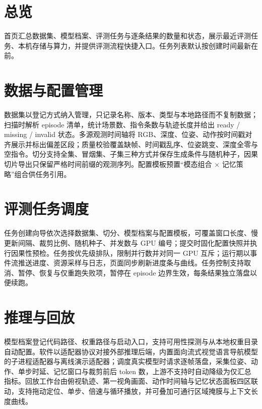 \section{总览}

首页汇总数据集、模型档案、评测任务与逐条结果的数量和状态，展示最近评测任务、本机存储与算力，并提供评测流程快捷入口。任务列表默认按创建时间最新在前。


\section{数据与配置管理}

数据集以登记方式纳入管理，只记录名称、版本、类型与本地路径而不复制数据；扫描时解析 episode 清单，统计场景数、指令条数与轨迹长度并给出 ready / missing / invalid 状态。多源观测时间轴将 RGB、深度、位姿、动作按时间戳对齐展示并标出偏差区段；质量校验覆盖缺帧、时间戳乱序、位姿跳变、深度全零与空指令。切分支持全集、冒烟集、子集三种方式并保存生成条件与随机种子，因果切片导出只保留严格时间前缀的观测序列。配置模板预置“模态组合 × 记忆策略”组合供任务引用。


\section{评测任务调度}

任务创建向导依次选择数据集、切分、模型档案与配置模板，可覆盖窗口长度、慢更新间隔、裁剪比例、随机种子、并发数与 GPU 编号；提交时固化配置快照并执行因果性预检。任务按优先级排队，限制并行数并对同一 GPU 互斥；运行期以事件流推送进度、资源采样与日志，页面同步刷新进度条与曲线。任务控制支持取消、暂停、恢复与仅重跑失败项，暂停在 episode 边界生效，每条结果独立落盘以便续跑。


\section{推理与回放}

模型档案登记代码路径、权重路径与启动入口，支持可用性探测与从本地权重目录自动配置。软件以适配器协议对接外部推理后端，内置面向流式视觉语言导航模型的子进程适配器与离线演示适配器；调度真实模型时请求逐帧落盘，采集位姿、动作、单步时延、记忆窗口与裁剪前后 token 数，上游不支持时自动降级为仅汇总指标。回放工作台由俯视轨迹、第一视角画面、动作时间轴与记忆状态面板四区联动，支持拖动定位、单步、倍速与循环播放，并可叠加可通行区域掩膜与上下文长度曲线。


